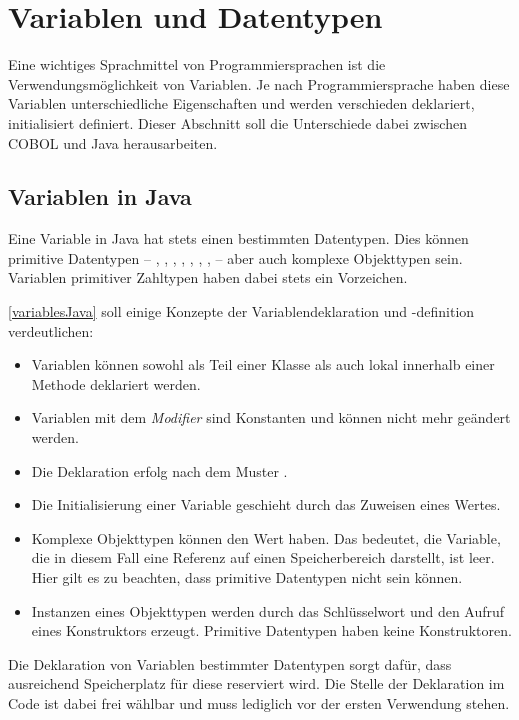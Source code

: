 \section{Variablen und Datentypen} \label{variables} \label{sec:scope}
Eine wichtiges Sprachmittel von Programmiersprachen ist die Verwendungsmöglichkeit von Variablen. Je nach Programmiersprache haben diese Variablen unterschiedliche Eigenschaften und werden verschieden deklariert, initialisiert \bzw definiert. Dieser Abschnitt soll die Unterschiede dabei zwischen COBOL und Java herausarbeiten.

\subsection*{Variablen in Java}
Eine Variable in Java hat stets einen bestimmten Datentypen. Dies können primitive Datentypen -- , , , , , , ,  -- aber auch komplexe Objekttypen sein. Variablen primitiver Zahltypen haben dabei stets ein Vorzeichen.


\autoref{variablesJava} soll einige Konzepte der Variablendeklaration und -definition verdeutlichen:
\begin{itemize}
 \item Variablen können sowohl als Teil einer Klasse als auch lokal innerhalb einer Methode deklariert werden. 
 \item Variablen mit dem \textit{Modifier}  sind Konstanten und können nicht mehr geändert werden.
 \item Die Deklaration erfolg nach dem Muster .
 \item Die Initialisierung einer Variable geschieht durch das Zuweisen eines Wertes.
 \item Komplexe Objekttypen können den Wert  haben. Das bedeutet, die Variable, die in diesem Fall eine Referenz auf einen Speicherbereich darstellt, ist leer. Hier gilt es zu beachten, dass primitive Datentypen nicht  sein können. 
 \item Instanzen eines Objekttypen werden durch das Schlüsselwort  und den Aufruf eines Konstruktors erzeugt. Primitive Datentypen haben keine Konstruktoren.
\end{itemize}
Die Deklaration von Variablen bestimmter Datentypen sorgt dafür, dass ausreichend Speicherplatz für diese reserviert wird. Die Stelle der Deklaration im Code ist dabei frei wählbar und muss lediglich vor der ersten Verwendung stehen. 

